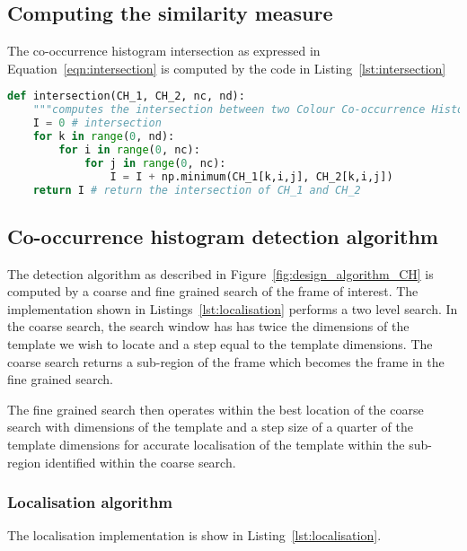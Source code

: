 \subsection{Computing the similarity measure}
The co-occurrence histogram intersection as expressed in
Equation~\ref{eqn:intersection} is computed by the code in
Listing~\ref{lst:intersection}

\begin{lstlisting}[language=Python, caption={Computing intersection of two CCH's}, captionpos=b, label={lst:intersection}]
def intersection(CH_1, CH_2, nc, nd):
    """computes the intersection between two Colour Co-occurrence Histograms""" 
    I = 0 # intersection
    for k in range(0, nd):
        for i in range(0, nc):
            for j in range(0, nc):
                I = I + np.minimum(CH_1[k,i,j], CH_2[k,i,j])
    return I # return the intersection of CH_1 and CH_2
\end{lstlisting}

\subsection{Co-occurrence histogram detection algorithm}
The detection algorithm as described in Figure~\ref{fig:design_algorithm_CH}
is computed by a coarse and fine grained search of the frame of interest. 
The implementation shown in Listings~\ref{lst:localisation} performs a two level
search. In the coarse search, the search window has has twice the dimensions of the
template we wish to locate and a step equal to the template dimensions. The
coarse search returns a sub-region of the frame which becomes the frame in the
fine grained search. 

The fine grained search then operates within the best location of the coarse
search with dimensions of the template and a step size of a quarter of the
template dimensions for accurate localisation of the template within the
sub-region identified within the coarse search.

\subsubsection{Localisation algorithm}
The localisation implementation is show in Listing~\ref{lst:localisation}.

